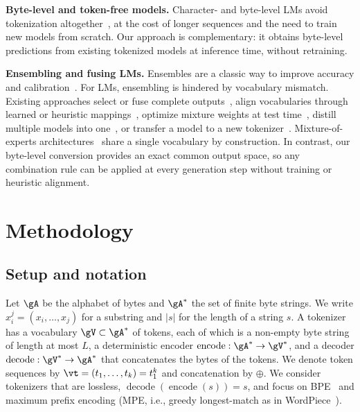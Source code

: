 \documentclass{article} %
\newcommand{\enc}{\operatorname{encode}}
\newcommand{\dec}{\operatorname{decode}}
\begin{document}
\textbf{Byte-level and token-free models.}
Character- and byte-level LMs avoid tokenization altogether~\citep{alrfou2019character,xue2022byt5,clark2022canine,tay2022charformer,yu2023megabyte,wang2024mambabyte}, at the cost of longer sequences and the need to train new models from scratch. Our approach is complementary: it obtains byte-level predictions from existing tokenized models at inference time, without retraining.

\textbf{Ensembling and fusing LMs.}
Ensembles are a classic way to improve accuracy and calibration~\citep{dietterich2000ensemble,lakshminarayanan2017deepensembles}. For LMs, ensembling is hindered by vocabulary mismatch. Existing approaches select or fuse complete outputs~\citep{jiang2023llmblender,wang2023selfconsistency}, align vocabularies through learned or heuristic mappings~\citep{xu2024eva,huang2024deepen,yu2024gac}, optimize mixture weights at test time~\citep{mavromatis2024packllm}, distill multiple models into one~\citep{wan2024fusellm}, or transfer a model to a new tokenizer~\citep{minixhofer2024zeroshot}. Mixture-of-experts architectures~\citep{shazeer2017moe,jiang2024mixtral} share a single vocabulary by construction. In contrast, our byte-level conversion provides an exact common output space, so any combination rule can be applied at every generation step without training or heuristic alignment.

\section{Methodology}
\label{sec:method}
\subsection{Setup and notation}
\label{sec:setup}
Let $\gA$ be the alphabet of bytes and $\gA^*$ the set of finite byte strings. We write $x_i^j=(x_i,\dots,x_j)$ for a substring and $|s|$ for the length of a string $s$. A tokenizer has a vocabulary $\gV\subset\gA^*$ of tokens, each of which is a non-empty byte string of length at most $L$, a deterministic encoder $\enc:\gA^*\to\gV^*$, and a decoder $\dec:\gV^*\to\gA^*$ that concatenates the bytes of the tokens. We denote token sequences by $\vt=(t_1,\dots,t_k)=t_1^k$ and concatenation by $\oplus$. We consider tokenizers that are lossless, $\dec(\enc(s))=s$, and focus on BPE~\citep{sennrich2016bpe} and maximum prefix encoding (MPE, i.e., greedy longest-match as in WordPiece~\citep{schuster2012wordpiece}).
\end{document}
